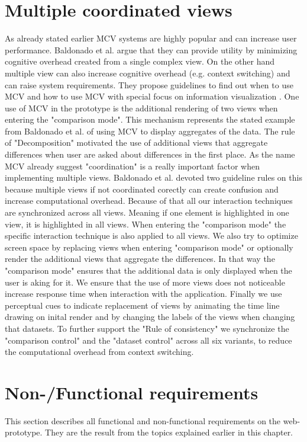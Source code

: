 \section{Multiple coordinated views}
As already stated earlier MCV systems are highly popular and can increase user performance. Baldonado et al. argue that they can provide utility
by minimizing cognitive overhead created from a single complex view. On the other hand multiple view can also increase cognitive overhead
(e.g. context switching) and can raise system requirements. They propose guidelines to find out when to use MCV and how to use MCV
with special focus on information visualization \citep*{WangBaldonado.2000}. One use of MCV in the prototype is the additional rendering of
two views when entering the "comparison mode". This mechanism represents the stated example from Baldonado et al. of using MCV to display
aggregates of the data. The rule of "Decomposition" motivated the use of additional views that aggregate differences when user are asked
about differences in the first place. As the name MCV already suggest "coordination" is a really important factor when implementing
multiple views. Baldonado et al. devoted two guideline rules on this because multiple views if not coordinated corectly can create
confusion and increase computational overhead. Because of that all our interaction techniques are synchronized across all views. Meaning if one
element is highlighted in one view, it is highlighted in all views. When entering the "comparison mode" the specific interaction technique
is also applied to all views. We also try to optimize screen space by replacing views when entering "comparison mode" or optionally render
the additional views that aggregate the differences. In that way the "comparison mode" ensures that the additional data is only displayed when the user is aking for it. We ensure that the use of more views does not noticeable increase
response time when interaction with the application. Finally we use perceptual cues to indicate replacement of views by animating
the time line drawing on inital render and by changing the labels of the views when changing that datasets. 
To further support the "Rule of consistency" we synchronize the "comparison control" and the "dataset control" across all six variants, to reduce
the computational overhead from context switching.

\section{Non-/Functional requirements}
This section describes all functional and non-functional requirements on the
web-prototype. They are the result from the topics explained earlier in this chapter.

